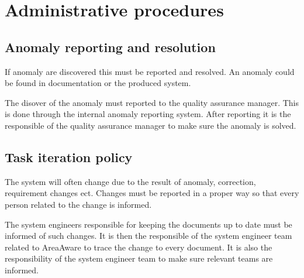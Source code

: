 \label{chp:testProcedure}
\chapter{Administrative procedures}

\section{Anomaly reporting and resolution}
If anomaly are discovered this must be reported and resolved. An anomaly could be found in documentation or the produced system.

The disover of the anomaly must reported to the quality assurance manager. This is done through the internal anomaly reporting system. After reporting it is the responsible of the quality assurance manager to make sure the anomaly is solved.

\section{Task iteration policy}
The system will often change due to the result of anomaly, correction, requirement changes ect. Changes must be reported in a proper way so that every person related to the change is informed.

The system engineers responsible for keeping the documents up to date must be informed of such changes. It is then the responsible of the system engineer team related to AreaAware to trace the change to every document. It is also the responsibility of the system engineer team to make sure relevant teams are informed.
